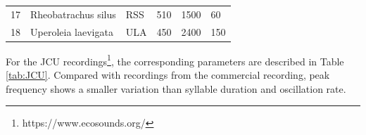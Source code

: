 \begin{table}[htb!]
{\begin{tabular}{llllll}
17        & Rheobatrachus silus           & RSS                & 510                                                                              & 1500                                                                 & 60                                                                               \\ 
18        & Uperoleia laevigata           & ULA                & 450                                                                              & 2400                                                                 & 150                                                                              \\ \hline\hline
\end{tabular}
}
\end{table}


For the JCU recordings\footnote[2]{https://www.ecosounds.org/}, the corresponding parameters are described in Table \ref{tab:JCU}. Compared with recordings from the commercial
recording, peak frequency shows a smaller variation than syllable duration and oscillation rate.


